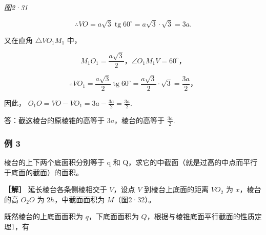 \emph{图2·31}

\[
\therefore V O = a \sqrt {3} \operatorname{tg} 60^{\circ} = a \sqrt {3} \cdot \sqrt {3} = 3 a.
\]

又在直角 \(\triangle VO_{1}M_{1}\) 中，

\[
M _ {1} O _ {1} = \frac {a \sqrt {3}}{2}\text{，} \angle O _ {1} M _ {1} V = 60^{\circ}\text{，}
\]

\[
\therefore V O _ {1} = \frac {a \sqrt {3}}{2} \operatorname{tg} 60^{\circ} = \frac {a \sqrt {3}}{2} \cdot \sqrt {3} = \frac {3 a}{2}\text{，}
\]

因此， \(O_{1}O = VO - VO_{1} = 3a - \frac{3a}{2} = \frac{3a}{2}.\)

答：截这棱台的原棱锥的高等于 \(3a\)，棱台的高等于 \(\frac{3a}{2}\).

\subsubsection{例 3}

棱台的上下两个底面积分别等于 q 和
Q，求它的中截面（就是过高的中点而平行于底面的截面）的面积。

\textbf{［解］} 延长棱台各条侧棱相交于 \(V\)，设点 \(V\)
到棱台上底面的距离 \(VO_{2}\) 为 \(x\)，棱台的高 \(O_{2}O\) 为
\(2h\)，中截面面积为 \(M\)（图2·32）。

既然棱台的上底面面积为 \(q\)，下底面面积为
\(Q\)，根据与棱锥底面平行截面的性质定理1，有

